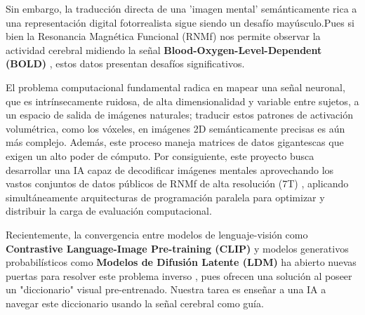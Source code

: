 \documentclass{article}
\begin{document}
Sin embargo, la traducción directa de una 'imagen mental' semánticamente rica a una representación digital fotorrealista sigue siendo un desafío mayúsculo.Pues si bien la Resonancia Magnética Funcional (RNMf) nos permite observar la actividad cerebral midiendo la señal \textbf{Blood-Oxygen-Level-Dependent (BOLD)} , estos datos presentan desafíos significativos.

El problema computacional fundamental radica en mapear una señal neuronal, que es intrínsecamente ruidosa, de alta dimensionalidad y variable entre sujetos, a un espacio de salida de imágenes naturales; traducir estos patrones de activación volumétrica, como los vóxeles, en imágenes 2D semánticamente precisas es aún más complejo. Además, este proceso maneja matrices de datos gigantescas que exigen un alto poder de cómputo. Por consiguiente, este proyecto busca desarrollar una IA capaz de decodificar imágenes mentales aprovechando los vastos conjuntos de datos públicos de RNMf de alta resolución (7T) \cite{2}, aplicando simultáneamente arquitecturas de programación paralela para optimizar y distribuir la carga de evaluación computacional.

Recientemente, la convergencia entre modelos de lenguaje-visión como \textbf{Contrastive Language-Image Pre-training (CLIP)} \cite{8} y modelos generativos probabilísticos como \textbf{Modelos de Difusión Latente (LDM)} \cite{9} ha abierto nuevas puertas para resolver este problema inverso \cite{5, 13}, pues ofrecen una solución al poseer un "diccionario" visual pre-entrenado. Nuestra tarea es enseñar a una IA a navegar este diccionario usando la señal cerebral como guía. 
\end{document}
